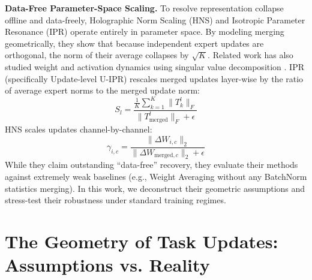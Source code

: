 \documentclass{article}
\theoremstyle{plain}
\theoremstyle{definition}
\theoremstyle{remark}
\begin{document}
\textbf{Data-Free Parameter-Space Scaling.} To resolve representation collapse offline and data-freely, Holographic Norm Scaling (HNS) \cite{Anonymous2026a} and Isotropic Parameter Resonance (IPR) \cite{Anonymous2026b} operate entirely in parameter space. By modeling merging geometrically, they show that because independent expert updates are orthogonal, the norm of their average collapses by $\sqrt{K}$. Related work has also studied weight and activation dynamics using singular value decomposition \cite{Leclaire2024}. IPR (specifically Update-level U-IPR) rescales merged updates layer-wise by the ratio of average expert norms to the merged update norm:
\begin{equation}
    S_l = \frac{\frac{1}{K}\sum_{k=1}^K \|T_k^l\|_F}{\|T_{\text{merged}}^l\|_F + \epsilon}
\end{equation}
HNS scales updates channel-by-channel:
\begin{equation}
    \gamma_{i,c} = \frac{\|\Delta W_{i,c}\|_2}{\|\Delta W_{\text{merged},c}\|_2 + \epsilon}
\end{equation}
While they claim outstanding ``data-free'' recovery, they evaluate their methods against extremely weak baselines (e.g., Weight Averaging without any BatchNorm statistics merging). In this work, we deconstruct their geometric assumptions and stress-test their robustness under standard training regimes.

\section{The Geometry of Task Updates: Assumptions vs. Reality}
\label{sec:geometry}
\end{document}
